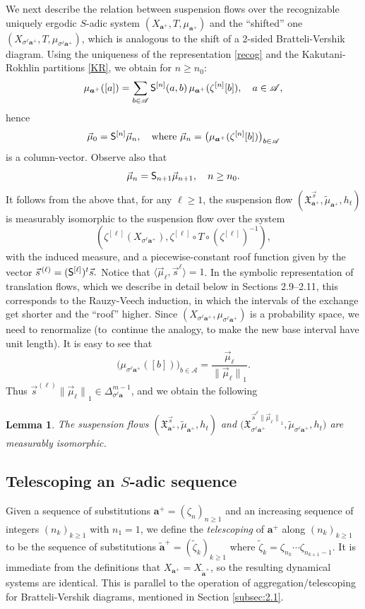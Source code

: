 \documentclass[10pt]{amsart}
\let\mathcal\mathscr
\theoremstyle{plain}
\newtheorem{lemma}[theorem]{Lemma}
\theoremstyle{definition}
\let\wt\widetilde
\newcommand\bom{{\boldsymbol a}}\let\ba\bom
\let\sig\sigma
\newcommand\Xx{\mathfrak{X}}
\newcommand\Ak{\mathcal{A}}
\newcommand\Sf{{\sf S}}
\newcommand\be{\begin{equation}}
\newcommand\ee{\end{equation}}
\begin{document}
We next describe the relation between suspension flows over the recognizable uniquely ergodic $S$-adic system $(X_{\bom^+},T, \mu_{\bom^+})$ and the ``shifted'' one $(X_{\sig^\ell\bom^+}, T, \mu_{\sig^\ell\bom^+})$, which is analogous to the shift of a 2-sided Bratteli-Vershik diagram.
Using the uniqueness of the representation \eqref{recog} and the Kakutani-Rokhlin partitions \eqref{KR}, we obtain for $n\ge n_0$:
\[
\mu_{\bom^+}([a]) = \sum_{b\in \Ak}\Sf^{[n]}(a,b)\,\mu_{\bom^+}(\zeta^{[n]}[b]),\quad a\in \Ak,
\]
hence
\be \label{eq-measure}
\vec{\mu}_0 = \Sf^{[n]}\vec{\mu}_n,\quad \text{where } \vec{\mu}_n = \bigl(\mu_{\bom^+}(\zeta^{[n]}[b])\bigr)_{b\in \Ak}
\ee
is a column-vector. Observe also that
\be \label{eq-measure2}
\vec{\mu}_n = \Sf_{n+1}\vec{\mu}_{n+1},\quad n\ge n_0.
\ee
It follows from the above that, for any $\ell\ge 1$, the suspension flow $(\Xx_{\ba^+}^{\vec{s}},\wt\mu_{\bom^+},h_t)$ is measurably isomorphic to the suspension flow over the system
\[
(\zeta^{[\ell]}(X_{\sig^\ell\ba^+}), \zeta^{[\ell]}\circ T\circ (\zeta^{[\ell]})^{-1}),
\]
with the induced measure, and a piecewise-constant roof function given by the vector
$
\vec{s}^{\,(\ell)}= (\Sf^{[\ell]})^t \vec{s}.
$
Notice that $\langle \vec\mu_\ell, \vec s^{\ell}\rangle=1$. In the symbolic representation of translation flows, which we describe in detail below in Sections 2.9--2.11, this corresponds to the Rauzy-Veech induction, in which the intervals of the exchange get shorter and the ``roof'' higher. Since $(X_{\sig^\ell\bom^+}, \mu_{\sig^\ell\bom^+})$ is a probability space, we need to renormalize
(to~continue the analogy, to make the new base interval have unit length).
It is easy to see that
\[
\bigl(\mu_{\sig^\ell \bom^+}([b])\bigr)_{b\in \Ak} = \frac{\vec\mu_\ell}{{\|\vec \mu_\ell\|}_1}.
\]
Thus $\vec s^{(\ell)}{\|\vec \mu_\ell\|}_1\in \Delta^{m-1}_{\sig^\ell\bom}$, and we obtain the following
\begin{lemma} \label{lem-shift}
The suspension flows $(\Xx_{\ba^+}^{\vec{s}},\wt{\mu}_{\bom^+},h_t)$ and $\bigl(\Xx_{\sig^\ell\ba^+}^{\vec{s}^{\ell}{\|\vec \mu_\ell\|}_1},\wt{\mu}_{\sig^\ell\bom^+},h_t\bigr)$ are measurably isomorphic.
\end{lemma}

\subsection{Telescoping an $S$-adic sequence \cite[5.2]{BSTY}}
Given a sequence of substitutions $\ba^+ = (\zeta_n)_{n\ge 1}$ and an increasing sequence of integers $(n_k)_{k\ge 1}$ with $n_1=1$, we define the \emph{telescoping} of $\ba^+$ along $(n_k)_{k\ge 1}$
to be the sequence of substitutions $\wt\ba^+ = (\wt \zeta_k)_{k\ge 1}$ where $\wt\zeta_k = \zeta_{n_k}\cdots \zeta_{n_{k+1}-1}$. It is immediate from the definitions that $X_{\ba^+}=X_{\wt\ba^+}$, so the
resulting dynamical systems are identical. This is parallel to the operation of aggregation/telescoping for Bratteli-Vershik diagrams, mentioned in Section \ref{subsec:2.1}.
\end{document}
